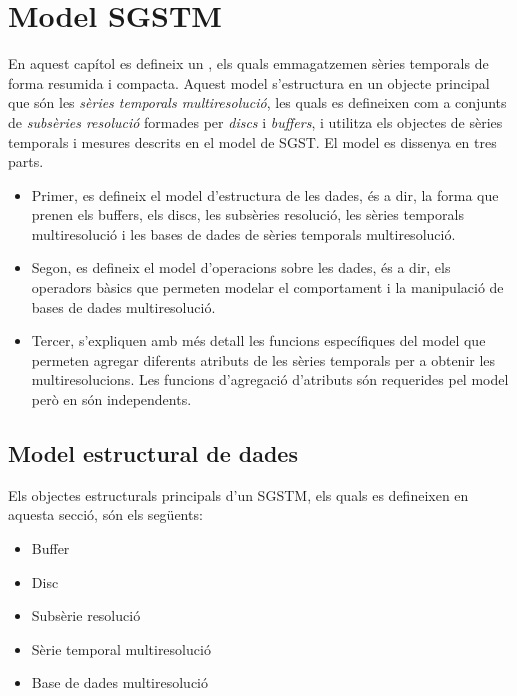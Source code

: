 \chapter{Model SGSTM}
\label{cap:model:sgstm}

En aquest capítol es defineix un , els quals emmagatzemen sèries temporals de forma
resumida i compacta. Aquest model s'estructura en un objecte principal
que són les \emph{sèries temporals multiresolució}, les quals es
defineixen com a conjunts de \emph{subsèries resolució}
formades per \emph{discs} i \emph{buffers}, i utilitza els objectes de
sèries temporals i mesures descrits en el model de \gls{SGST}.  El
model es dissenya en tres parts.

\begin{itemize}
\item Primer, es defineix el model d'estructura de les dades, és a
  dir, la forma que prenen els buffers, els discs, les subsèries
  resolució, les sèries temporals multiresolució i les bases de dades
  de sèries temporals multiresolució.

\item Segon, es defineix el model d'operacions sobre les dades, és a
  dir, els operadors bàsics que permeten modelar el comportament i la
  manipulació de bases de dades multiresolució.

\item Tercer, s'expliquen amb més detall les funcions específiques del
  model que permeten agregar diferents atributs de les sèries
  temporals per a obtenir les multiresolucions. Les funcions
  d'agregació d'atributs són requerides pel model però en són
  independents.
\end{itemize}




\section{Model estructural de dades}

Els objectes estructurals principals d'un \gls{SGSTM}, els quals es
defineixen en aquesta secció, són els següents:
\begin{itemize}
\item Buffer
\item Disc
\item Subsèrie resolució
\item Sèrie temporal multiresolució
\item Base de dades multiresolució
\end{itemize}


